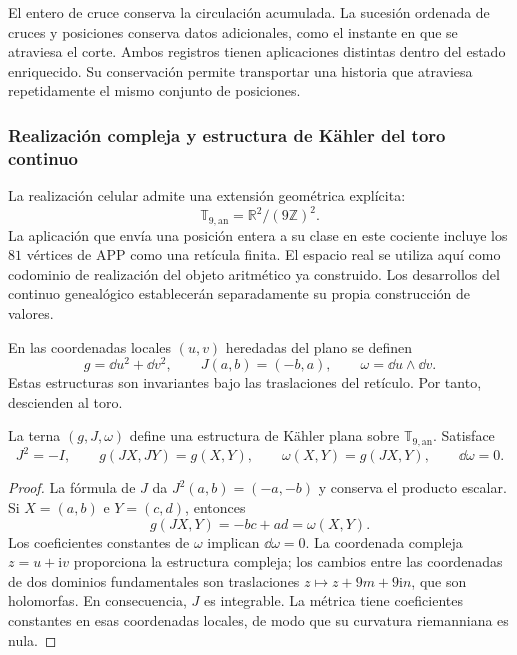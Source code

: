 El entero de cruce conserva la circulación acumulada. La sucesión ordenada de cruces y posiciones conserva datos adicionales, como el instante en que se atraviesa el corte. Ambos registros tienen aplicaciones distintas dentro del estado enriquecido. Su conservación permite transportar una historia que atraviesa repetidamente el mismo conjunto de posiciones.

\subsubsection{Realización compleja y estructura de Kähler del toro continuo}
\label{geo:kahler}

La realización celular admite una extensión geométrica explícita:
\[
 \mathbb T_{9,\mathrm{an}}=\mathbb R^2/(9\mathbb Z)^2.
\]
La aplicación que envía una posición entera a su clase en este cociente incluye los $81$ vértices de APP como una retícula finita. El espacio real se utiliza aquí como codominio de realización del objeto aritmético ya construido. Los desarrollos del continuo genealógico establecerán separadamente su propia construcción de valores.

En las coordenadas locales $(u,v)$ heredadas del plano se definen
\[
 g=\dd u^2+\dd v^2,\qquad
 J(a,b)=(-b,a),\qquad
 \omega=\dd u\wedge\dd v.
\]
Estas estructuras son invariantes bajo las traslaciones del retículo. Por tanto, descienden al toro.

\begin{proposicion}
\label{geo:prop-kahler}
La terna $(g,J,\omega)$ define una estructura de Kähler plana sobre $\mathbb T_{9,\mathrm{an}}$. Satisface
\[
 J^2=-I,\qquad g(JX,JY)=g(X,Y),\qquad
 \omega(X,Y)=g(JX,Y),\qquad \dd\omega=0.
\]
\end{proposicion}

\begin{proof}
La fórmula de $J$ da $J^2(a,b)=(-a,-b)$ y conserva el producto escalar. Si $X=(a,b)$ e $Y=(c,d)$, entonces
\[
 g(JX,Y)=-bc+ad=\omega(X,Y).
\]
Los coeficientes constantes de $\omega$ implican $\dd\omega=0$. La coordenada compleja $z=u+\mathrm i v$ proporciona la estructura compleja; los cambios entre las coordenadas de dos dominios fundamentales son traslaciones $z\mapsto z+9m+9\mathrm i n$, que son holomorfas. En consecuencia, $J$ es integrable. La métrica tiene coeficientes constantes en esas coordenadas locales, de modo que su curvatura riemanniana es nula.
\end{proof}

